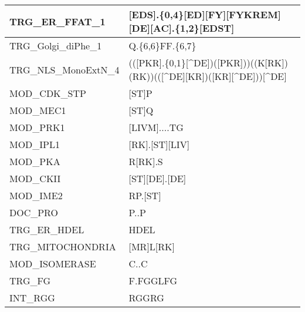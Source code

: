 \begin{landscape}
\begin{longtable}{|l|l|}
\hline
TRG\_ER\_FFAT\_1       & {[}EDS].\{0,4\}{[}ED][FY][FYKREM][DE][AC].\{1,2\}{[}EDST]                                                                  \\
\hline
TRG\_Golgi\_diPhe\_1   & Q.\{6,6\}FF.\{6,7\}                                                                                                        \\
\hline
TRG\_NLS\_MonoExtN\_4  & (([PKR].\{0,1\}{[}\^{}DE])\textbar{}([PKR]))((K[RK])\textbar{}(RK))(([\^{}DE][KR])\textbar{}([KR][\^{}DE]))[\^{}DE]        \\
\hline
MOD\_CDK\_STP          & {[}ST]P                                                                                                                    \\
\hline
MOD\_MEC1              & {[}ST]Q                                                                                                                    \\
\hline
MOD\_PRK1              & {[}LIVM]....TG                                                                                                             \\
\hline
MOD\_IPL1              & {[}RK].[ST][LIV]                                                                                                           \\
\hline
MOD\_PKA               & R[RK].S                                                                                                                    \\
\hline
MOD\_CKII              & {[}ST][DE].[DE]                                                                                                            \\
\hline
MOD\_IME2              & RP.[ST]                                                                                                                    \\
\hline
DOC\_PRO               & P..P                                                                                                                       \\
\hline
TRG\_ER\_HDEL          & HDEL                                                                                                                       \\
\hline
TRG\_MITOCHONDRIA      & {[}MR]L[RK]                                                                                                                \\
\hline
MOD\_ISOMERASE         & C..C                                                                                                                       \\
\hline
TRG\_FG                & F.FG\textbar{}GLFG                                                                                                         \\
\hline
INT\_RGG               & RGG\textbar{}RG                                                                                                            \\
\hline
\end{longtable}
\end{landscape}